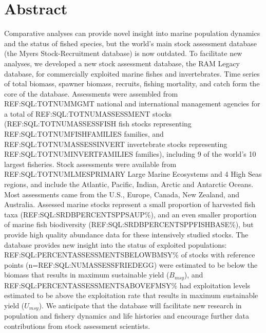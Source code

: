 \section*{Abstract}

Comparative analyses can provide novel insight into marine population dynamics and the status of fished species, but the world's main stock assessment database (the Myers Stock-Recruitment database) is now outdated.  
To facilitate new analyses, we developed a new stock assessment database, the RAM Legacy database, for commercially exploited marine fishes and invertebrates. 
Time series of total biomass, spawner biomass, recruits, fishing mortality, and catch form the core of the database. 
Assessments were assembled from REF:SQL:TOTNUMMGMT national and international management agencies for a total of REF:SQL:TOTNUMASSESSMENT stocks (REF:SQL:TOTNUMASSESSFISH fish stocks representing REF:SQL:TOTNUMFISHFAMILIES families, and REF:SQL:TOTNUMASSESSINVERT invertebrate stocks representing REF:SQL:TOTNUMINVERTFAMILIES families), including 9 of the world's 10 largest fisheries. Stock assessments were available from REF:SQL:TOTNUMLMESPRIMARY Large Marine Ecosystems and 4 High Seas regions, and include the Atlantic, Pacific, Indian, Arctic and Antarctic Oceans. 
Most assessments came from the U.S., Europe, Canada, New Zealand, and Australia. Assessed marine stocks represent a small proportion of harvested fish taxa (REF:SQL:SRDBPERCENTSPPSAUP\%), and an even smaller proportion of marine fish biodiversity (REF:SQL:SRDBPERCENTSPPFISHBASE\%), but provide high quality abundance data for these intensively studied stocks. 
The database provides new insight into the status of exploited populations: REF:SQL:PERCENTASSESSMENTSBELOWBMSY\% of stocks with reference points (n=REF:SQL:NUMASSESSFRIEDEGG) were estimated to be below the biomass that results in maximum sustainable yield ($B_{msy}$), and REF:SQL:PERCENTASSESSMENTSABOVEFMSY\% had exploitation levels estimated to be above the exploitation rate that results in maximum sustainable yield ($U_{msy}$).
We anticipate that the database will facilitate new research in population and fishery dynamics and life histories and encourage further data contributions from stock assessment scientists.

